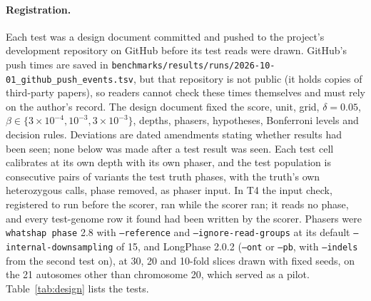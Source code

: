 \documentclass[11pt]{article}
\theoremstyle{definition}
\theoremstyle{remark}
\begin{document}
\paragraph{Registration.} Each test was a design document committed and
pushed to the project's development repository on GitHub before its test
reads were drawn. GitHub's push times are saved in
\nolinkurl{benchmarks/results/runs/2026-10-01_github_push_events.tsv}, but
that repository is not public (it holds copies of third-party papers), so
readers cannot check these times themselves and must rely on the author's
record. The design document fixed the score, unit, grid, $\delta=0.05$,
$\beta\in\{3\times10^{-4},10^{-3},3\times10^{-3}\}$, depths, phasers,
hypotheses, Bonferroni levels and decision rules. Deviations are dated
amendments stating whether results had been seen; none below was made after
a test result was seen. Each test cell calibrates at its own depth with its
own phaser, and the test population is consecutive pairs of variants the
test truth phases, with the truth's own heterozygous calls, phase removed,
as phaser input. In T4 the input check, registered to run before the
scorer, ran while the scorer ran; it reads no phase, and every test-genome
row it found had been written by the scorer. Phasers were \texttt{whatshap phase} 2.8 with
\texttt{--reference} and \texttt{--ignore-read-groups} at its default
\texttt{--internal-downsampling} of 15, and LongPhase 2.0.2 (\texttt{--ont}
or \texttt{--pb}, with \texttt{--indels} from the second test on), at 30, 20
and 10-fold slices drawn with fixed seeds, on the 21 autosomes other than
chromosome 20, which served as a pilot. Table~\ref{tab:design} lists the
tests.
\end{document}
